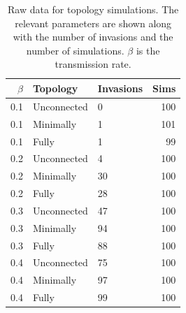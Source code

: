 \begin{table}[ht]
\centering
\caption[
Raw data for topology simulations
  ]{
Raw data for topology simulations.
The relevant parameters are shown along with the number of invasions and the number of simulations.
$\beta$ is the transmission rate.
} 
\label{B-topo}
\begingroup\small
\begin{tabular}{@{}rllr@{}}
  \toprule
$\beta$ & Topology & Invasions & Sims \\ 
  \midrule
0.1 & Unconnected & 0 & 100 \\ 
  0.1 & Minimally & 1 & 101 \\ 
  0.1 & Fully & 1 & 99 \\ 
  0.2 & Unconnected & 4 & 100 \\ 
  0.2 & Minimally & 30 & 100 \\ 
  0.2 & Fully & 28 & 100 \\ 
  0.3 & Unconnected & 47 & 100 \\ 
  0.3 & Minimally & 94 & 100 \\ 
  0.3 & Fully & 88 & 100 \\ 
  0.4 & Unconnected & 75 & 100 \\ 
  0.4 & Minimally & 97 & 100 \\ 
  0.4 & Fully & 99 & 100 \\ 
   \bottomrule
\end{tabular}
\endgroup
\end{table}






